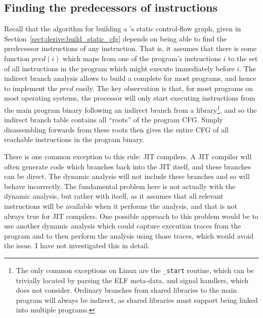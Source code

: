 
\subsection{Finding the predecessors of instructions}
\label{sect:program_model:instr_predecessors}

Recall that the algorithm for building a 's
static control-flow graph, given in
Section~\ref{sect:derive:build_static_cfg} depends on being able to
find the predecessor instructions of any instruction.  That is, it
assumes that there is some function $\mathit{pred}(i)$ which maps from
one of the program's instructions $i$ to the set of all instructions
in the program which might execute immediately before $i$.  The
indirect branch analysis allows {\technique} to build a complete
 for most programs, and hence to implement the
$\mathit{pred}$ easily.  The key observation is that, for most
programs on most operating systems, the processor will only start
executing instructions from the main program binary following an
indirect branch from a library\footnote{The only common exceptions on
  Linux are the \texttt{\_start} routine, which can be trivially
  located by parsing the ELF meta-data, and signal handlers, which
  {\technique} does not consider.  Ordinary branches from shared
  libraries to the main program will always be indirect, as shared
  libraries must support being linked into multiple programs.}, and so
the indirect branch table contains all ``roots'' of the program CFG.
Simply disassembling forwards from these roots then gives the entire
CFG of all reachable instructions in the program binary.

There is one common exception to this rule: JIT compilers\needCite{}.
A JIT compiler will often generate code which branches back into the
JIT itself, and these branches can be direct.  The
dynamic analysis will not include these branches and so
{\implementation} will behave incorrectly.  The fundamental problem
here is not actually with the dynamic analysis, but rather with
{\technique} itself, as it assumes that all relevant instructions will
be available when it performs the analysis, and that is not always
true for JIT compilers.  One possible approach to this problem would
be to use another dynamic analysis which could capture execution
traces from the program and to then perform the analysis using those
traces, which would avoid the issue.  I have not investigated this in
detail.

